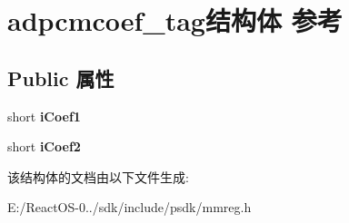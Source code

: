 \hypertarget{structadpcmcoef__tag}{}\section{adpcmcoef\+\_\+tag结构体 参考}
\label{structadpcmcoef__tag}
\subsection*{Public 属性}
\begin{DoxyCompactItemize}
\item 
\mbox{\label{structadpcmcoef__tag_a8adca24540cfe19c303d9b86b842d8dd}} 
short {\bfseries i\+Coef1}
\item 
\mbox{\label{structadpcmcoef__tag_ae5efd007963eb5d1fbaee90f7dd73a88}} 
short {\bfseries i\+Coef2}
\end{DoxyCompactItemize}


该结构体的文档由以下文件生成\+:\begin{DoxyCompactItemize}
\item 
E\+:/\+React\+O\+S-\/0../sdk/include/psdk/mmreg.\+h\end{DoxyCompactItemize}
